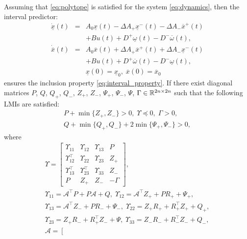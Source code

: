 \documentclass{article}
\begin{document}
\begin{theorem}
\label{thm:predictor}
Assuming that \eqref{eq:polytope} is satisfied for the system \eqref{eq:dynamics}, then the interval predictor:
\begin{eqnarray}
\dot{\underline{x}}(t) & = & A_{0}\underline{x}(t)-\Delta A_{+}\underline{x}^{-}(t)-\Delta A_{-}\overline{x}^{+}(t)\nonumber \\
 &  & +Bu(t)+D^{+}\underline{\omega}(t)-D^{-}\overline{\omega}(t),\nonumber\\
\dot{\overline{x}}(t) & = & A_{0}\overline{x}(t)+\Delta A_{+}\overline{x}^{+}(t)+\Delta A_{-}\underline{x}^{-}(t) \label{eq:interval_predictor} \\
 &  & +Bu(t)+D^{+}\overline{\omega}(t)-D^{-}\underline{\omega}(t),\nonumber \\
 &  & \underline{x}(0)=\underline{x}_{0},\;\overline{x}(0)=\overline{x}_{0}\nonumber 
\end{eqnarray}
ensures the inclusion property \eqref{eq:interval_property}. If there exist diagonal matrices $P$, $Q$, $Q_{+}$, $Q_{-}$, $Z_{+}$, $Z_{-}$, $\Psi_{+}$, $\Psi_{-}$, $\Psi$, $\Gamma\in\mathbb{R}^{2n\times 2n}$ such that the following LMIs are satisfied:
\begin{gather*}
P+\min\{Z_{+},Z_{-}\}>0,\;\Upsilon\preceq0,\;\Gamma>0,\\
Q+\min\{Q_{+},Q_{-}\}+2\min\{\Psi_{+},\Psi_{-}\}>0,
\end{gather*}
where{\footnotesize{}
\begin{gather*}
\Upsilon=\left[\begin{array}{cccc}
\Upsilon_{11} & \Upsilon_{12} & \Upsilon_{13} & P\\
\Upsilon_{12}^{\top} & \Upsilon_{22} & \Upsilon_{23} & Z_{+}\\
\Upsilon_{13}^{\top} & \Upsilon_{23}^{\top} & \Upsilon_{33} & Z_{-}\\
P & Z_{+} & Z_{-} & -\Gamma
\end{array}\right],\\
\Upsilon_{11}=\mathcal{A}^{\top}P+P\mathcal{A}+Q,\;\Upsilon_{12}=\mathcal{A}^{\top}Z_{+}+PR_{+}+\Psi_{+},\\
\Upsilon_{13}=\mathcal{A}^{\top}Z_{-}+PR_{-}+\Psi_{-},\;\Upsilon_{22}=Z_{+}R_{+}+R_{+}^{\top}Z_{+}+Q_{+},\\
\Upsilon_{23}=Z_{+}R_{-}+R_{+}^{\top}Z_{-}+\Psi,\;\Upsilon_{33}=Z_{-}R_{-}+R_{-}^{\top}Z_{-}+Q_{-},\\
\mathcal{A}=\left[\begin{array}{cc}

\end{array}
\end{gather*}}
\end{theorem}
\end{document}
